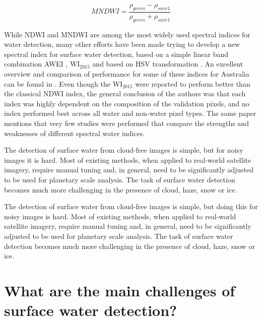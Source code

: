 \begin{equation}
MNDWI =  \frac{\rho_{green} - \rho_{swir1}}{\rho_{green} + \rho_{swir1}} 
\end{equation}

While NDWI and MNDWI are among the most widely used spectral indices for water detection, many other efforts have been made trying to develop a new spectral index for surface water detection, based on a simple linear band combination AWEI \citet{feyisa2014automated}, WI$_{2015}$ \citet{fisher2016comparing} and based on HSV transformation \citet{pekel2014near}. An excellent overview and comparison of performance for some of these indices for Australia can be found in \citet{fisher2016comparing}. Even though the WI$_{2015}$ were reported to perform better than the classical NDWI index, the general conclusion of the authors was that each index was highly dependent on the composition of the validation pixels, and no index performed best across all water and non-water pixel types. The same paper mentions that very few studies were performed that compare the strengths and weaknesses of different spectral water indices. 

The detection of surface water from cloud-free images is simple, but for noisy images it is hard. Most of existing methods, when applied to real-world satellite imagery, require manual tuning and, in general, need to be significantly adjusted to be used for planetary scale analysis. The task of surface water detection becomes much more challenging in the presence of cloud, haze, snow or ice. 

The detection of surface water from cloud-free images is simple, but doing this for noisy images is hard. Most of existing methods, when applied to real-world satellite imagery, require manual tuning and, in general, need to be significantly adjusted to be used for planetary scale analysis. The task of surface water detection becomes much more challenging in the presence of cloud, haze, snow or ice. 

\section{What are the main challenges of surface water detection?}

